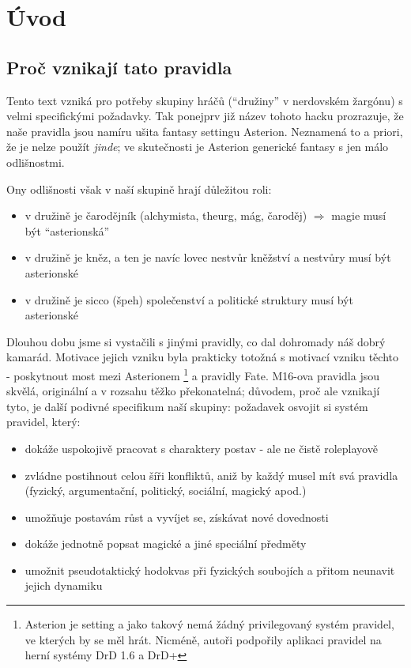 \chapter{Úvod}
\label{chap:introduction}

\section{Proč vznikají tato pravidla}
\label{sec:proc-pravidla}


Tento text vzniká pro potřeby skupiny hráčů (``družiny'' v nerdovském žargónu) s velmi specifickými požadavky. Tak ponejprv již název tohoto hacku prozrazuje, že naše pravidla jsou namíru ušita fantasy settingu Asterion. Neznamená to a priori, že je nelze použít \textit{jinde}; ve skutečnosti je Asterion generické fantasy s jen málo odlišnostmi. 

Ony odlišnosti však v naší skupině hrají důležitou roli:

\begin{itemize}
\item v družině je čarodějník (alchymista, theurg, mág, čaroděj) $\Rightarrow$ magie musí být ``asterionská''
\item v družině je kněz, a ten je navíc lovec nestvůr \Rightarrow kněžství a nestvůry musí být asterionské
\item v družině je sicco (špeh) \Rightarrow společenství a politické struktury musí být asterionské
\end{itemize}

Dlouhou dobu jsme si vystačili s jinými pravidly, co dal dohromady náš dobrý kamarád. Motivace jejich vzniku byla prakticky totožná s motivací vzniku těchto - poskytnout most mezi Asterionem \footnote{Asterion je setting a jako takový nemá žádný privilegovaný systém pravidel, ve kterých by se měl hrát. Nicméně, autoři podpořily aplikaci pravidel na herní systémy DrD 1.6 a DrD+} a pravidly Fate. M16-ova pravidla jsou skvělá, originální a v rozsahu těžko překonatelná; důvodem, proč ale vznikají tyto, je další podivné specifikum naší skupiny: požadavek osvojit si systém pravidel, který:

\begin{itemize}
\item dokáže uspokojivě pracovat s charaktery postav - ale ne čistě roleplayově
\item zvládne postihnout celou šíři konfliktů, aniž by každý musel mít svá pravidla (fyzický, argumentační, politický, sociální, magický apod.)
\item umožňuje postavám růst a vyvíjet se, získávat nové dovednosti
\item dokáže jednotně popsat magické a jiné speciální předměty
\item umožnit pseudotaktický hodokvas při fyzických soubojích a přitom neunavit jejich dynamiku
\end{itemize}

